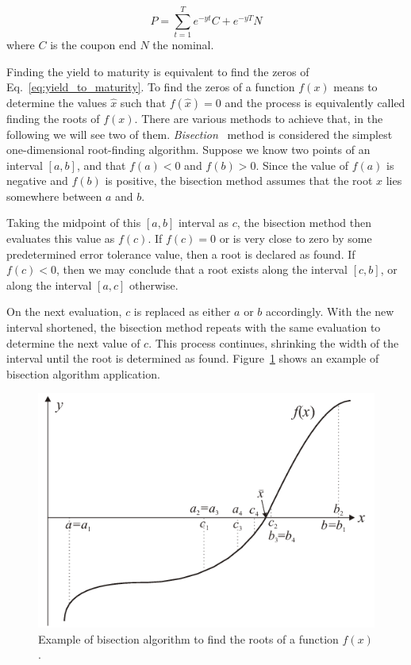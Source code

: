 \begin{equation}
P = \sum_{t=1}^T e^{-yt}C + e^{-yT}N 
\label{eq:yield_to_maturity}
\end{equation}
where $C$ is the coupon end $N$ the nominal.

Finding the yield to maturity is equivalent to find the zeros of Eq.~\ref{eq:yield_to_maturity}.
To find the zeros of a function $f(x)$ means to determine the values $\hat{x}$ such that $f(\hat{x})=0$ and the process is equivalently called finding the roots of $f(x)$. There are various methods to achieve that, in the following we will see two of them.
\label{sec:root_finding}
\emph{Bisection}~\cite{bib:bisection} method is considered the simplest one-dimensional root-finding algorithm.
Suppose we know two points of an interval $[a,b]$, and that $f (a)\lt 0$ and $f(b)\gt 0$.
Since the value of $f(a)$ is negative and $f(b)$ is positive, the bisection method assumes that the root $x$ lies somewhere between $a$ and $b$.

Taking the midpoint of this $[a, b]$ interval as $c$, the bisection method then evaluates this value as $f(c)$.
If $f(c) = 0$ or is very close to zero by some predetermined error tolerance value, then a root is declared as found. If $f(c)\lt 0$, then we may conclude that a root exists along the interval $[c, b]$, or along the interval $[a,c]$ otherwise.

On the next evaluation, $c$ is replaced as either $a$ or $b$ accordingly. With the new interval shortened, the bisection method repeats with the same evaluation to determine the next value of $c$. This process continues, shrinking the width of the interval until the root is determined as found. Figure~\ref{fig:bisection} shows an example of bisection algorithm application.

\begin{figure}[htbp]
\centering
\includegraphics[width=0.7\linewidth]{figures/bisection}
\caption{Example of bisection algorithm to find the roots of a function $f(x)$.}
\label{fig:bisection}
\end{figure}

